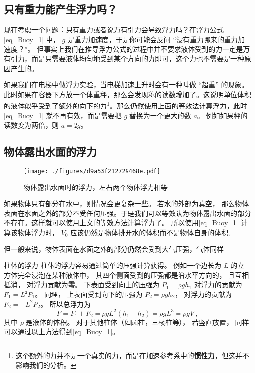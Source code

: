 \subsection{只有重力能产生浮力吗？}
现在考虑一个问题：只有重力或者说万有引力会导致浮力吗？在浮力公式\autoref{eq_Buoy_1} 中， $g$ 是重力加速度，于是你可能会反问 “没有重力哪来的重力加速度？”。 但事实上我们在推导浮力公式的过程中并不要求液体受到的力一定是万有引力，而是只需要液体均匀地受到某个方向的力即可，这个力也不需要是一种原因产生的。

如果我们在电梯中做浮力实验，当电梯加速上升时会有一种叫做 “超重” 的现象。 此时如果在容器下方放一个体重秤，那么会发现称的读数增加了。这说明单位体积的液体似乎受到了额外的向下的力\footnote{这个额外的力并不是一个真实的力，而是在加速参考系中的\textbf{惯性力}，但这并不影响我们的分析。}。那么仍然使用上面的等效法计算浮力，此时\autoref{eq_Buoy_1} 就不再有效，而是需要把 $g$ 替换为一个更大的数 $a$。 例如如果秤的读数变为两倍，则 $a = 2g$。

\subsection{物体露出水面的浮力}
\begin{figure}[ht]
\centering
\texttt{[image: ./figures/d9a53f212729468e.pdf]}
\caption{物体露出水面时的浮力，左右两个物体浮力相等} \label{fig_Buoy_2}
\end{figure}
如果物体只有部分在水中，则情况会更复杂一些。 若水的外部为真空， 那么物体表面在水面之外的部分不受任何压强。于是我们可以等效认为物体露出水面的部分不存在。这样就可以使用上文的等效方法计算浮力了。 所以使用\autoref{eq_Buoy_1} 计算该物体浮力时， $V_0$ 应该仍然是物体排开水的体积而不是物体自身的体积。


但一般来说，物体表面在水面之外的部分仍然会受到大气压强，气体同样

\begin{example}{柱体的浮力}
柱体的浮力容易通过简单的压强计算获得。 例如一个边长为 $L$ 的立方体完全浸泡在某种液体中， 其四个侧面受到的压强都是沿水平方向的， 且互相抵消， 对浮力贡献为零。 下表面受到向上的压强为 $P_1 = \rho g h_1$ 对浮力的贡献为 $F_1 = L^2 P_1$。 同理， 上表面受到向下的压强为 $P_2 = \rho g h_2$， 对浮力的贡献为 $F_2 = -L^2 P_2$。 所以总浮力为
\begin{equation}
F = F_1 + F_2 = \rho g L^2 (h_1 - h_2) = \rho g L^3 = \rho g V~,
\end{equation}
其中 $\rho$ 是液体的体积。 对于其他柱体（如圆柱，三棱柱等）， 若竖直放置， 同样可以通过以上方法得到\autoref{eq_Buoy_1}。
\end{example}

